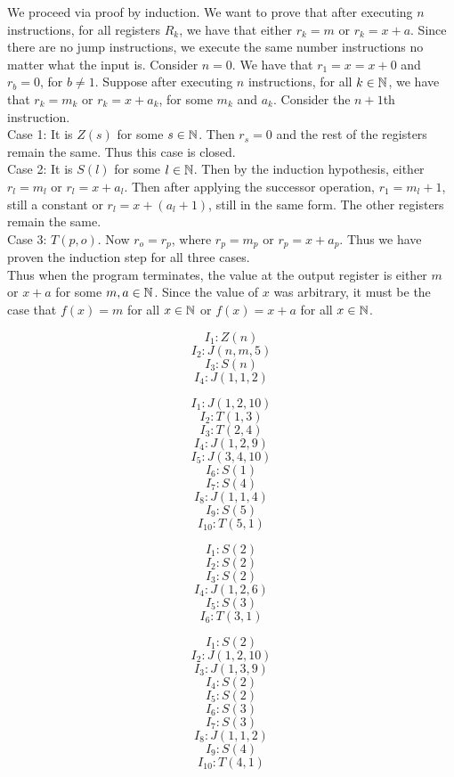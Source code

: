 \begin{exe}[3.3.3]
We proceed via proof by induction. We want to prove that after executing $n$ instructions, for all registers $R_k$, we have that either $r_k = m$ or $r_k = x + a$. Since there are no jump instructions, we execute the same number instructions no matter what the input is. Consider $n = 0$. We have that $r_1 = x  = x + 0$ and $r_b = 0$, for $b \neq 1$. Suppose after executing $n$ instructions, for all $k \in \mathbb{N}$, we have that $r_k = m_k$ or $r_k = x + a_k$, for some $m_k$ and $a_k$. Consider the $n+1$th instruction.\\
Case 1: It is $Z(s)$ for some $s \in \mathbb{N}$. Then $r_s = 0$ and the rest of the registers remain the same. Thus this case is closed.\\
Case 2: It is $S(l)$ for some $l \in \mathbb{N}$. Then by the induction hypothesis, either $r_l = m_l$ or $r_l = x + a_l$. Then after applying the successor operation, $r_1 = m_l + 1$, still a constant or $r_l = x + (a_l + 1)$, still in the same form. The other registers remain the same.\\
Case 3: $T(p, o)$. Now $r_o = r_p$, where $r_p = m_p$ or $r_p = x + a_p$. Thus we have proven the induction step for all three cases.\\
Thus when the program terminates, the value at the output register is either $m$ or $x + a$ for some $m, a \in \mathbb{N}$. Since the value of $x$ was arbitrary, it must be the case that $f(x) = m$ for all $x \in \mathbb{N}$ or $f(x) = x + a$ for all $x \in \mathbb{N}$.
\end{exe}
\begin{exe}[3.3.4]
\[I_1: Z(n)\]
\[I_2: J(n, m, 5)\]
\[I_3: S(n)\]
\[I_4: J(1, 1, 2)\]

\end{exe}
\begin{exe}[4.3b]
\[I_1: J(1, 2, 10)\]
\[I_2: T(1, 3)\]
\[I_3: T(2, 4)\]
\[I_4: J(1, 2, 9)\]
\[I_5: J(3, 4, 10)\]
\[I_6: S(1)\]
\[I_7: S(4)\]
\[I_8: J(1, 1, 4)\]
\[I_9: S(5)\]
\[I_{10}: T(5, 1)\]
\end{exe}
\begin{exe}[4.3b]
\[I_1: S(2)\]
\[I_2: S(2)\]
\[I_3: S(2)\]
\[I_4: J(1, 2, 6)\]
\[I_5: S(3)\]
\[I_6: T(3, 1)\]
\end{exe}
\begin{exe}[4.3c]
\[I_1: S(2)\]
\[I_2: J(1, 2, 10)\]
\[I_3: J(1, 3, 9)\]
\[I_4: S(2)\]
\[I_5: S(2)\]
\[I_6: S(3)\]
\[I_7: S(3)\]
\[I_8: J(1, 1, 2)\]
\[I_9 : S(4)\]
\[I_{10}: T(4, 1)\]
\end{exe}
